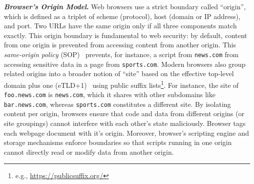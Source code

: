 \noindent \textbf{\textit{Browser's Origin Model}.} 
%
Web browsers use a strict boundary called ``origin'', which is defined as a triplet of scheme (protocol), host (domain or IP address), and port. 
%
Two URLs have the same origin only if all three components match exactly. 
%
%
This origin boundary is fundamental to web security: by default, content from one origin is prevented from accessing content from another origin. 
%
This \textit{same-origin policy} (SOP)~\cite{mdnSameoriginPolicySecurity2024} prevents, for instance, a script from \texttt{news.com} from accessing sensitive data in a page from \texttt{sports.com}.
%
Modern browsers also group related origins into a broader notion of ``site'' based on the effective top-level domain plus one (eTLD+1)~\cite{TrackingPreventionWebKit2020} using public suffix lists\footnote{e.g., \url{https://publicsuffix.org/}}.
%
For instance, the site of \texttt{foo.news.com} is \texttt{news.com}, which it shares with other subdomains like \texttt{bar.news.com}, whereas \texttt{sports.com} constitutes a different site.
%
By isolating content per origin, browsers ensure that code and data from different origins (or site groupings) cannot interfere with each other’s state maliciously.
%
%
Browser tags each webpage document with it's origin.
%
Moreover, browser’s scripting engine and storage mechanisms enforce boundaries so that scripts running in one origin cannot directly read or modify data from another origin.


